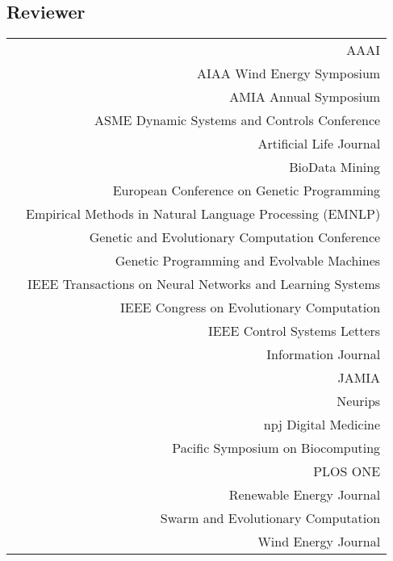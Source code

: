 \subsection*{Reviewer} 
\begin{tabular}{L!{\VRule}R}
        & AAAI \\
        & AIAA Wind Energy Symposium  \\
        & AMIA Annual Symposium \\
        & ASME Dynamic Systems and Controls Conference \\
        & Artificial Life Journal \\
        & BioData Mining \\
        & European Conference on Genetic Programming \\
        & Empirical Methods in Natural Language Processing (EMNLP) \\
        & Genetic and Evolutionary Computation Conference \\
        & Genetic Programming and Evolvable Machines \\
        & IEEE Transactions on Neural Networks and Learning Systems\\
        & IEEE Congress on Evolutionary Computation \\
        & IEEE Control Systems Letters \\
        & Information Journal \\
        & JAMIA \\
        & Neurips \\
        & npj Digital Medicine \\
        & Pacific Symposium on Biocomputing\\
        & PLOS ONE \\
        & Renewable Energy Journal \\
        & Swarm and Evolutionary Computation \\
        & Wind Energy Journal \\
\end{tabular}

